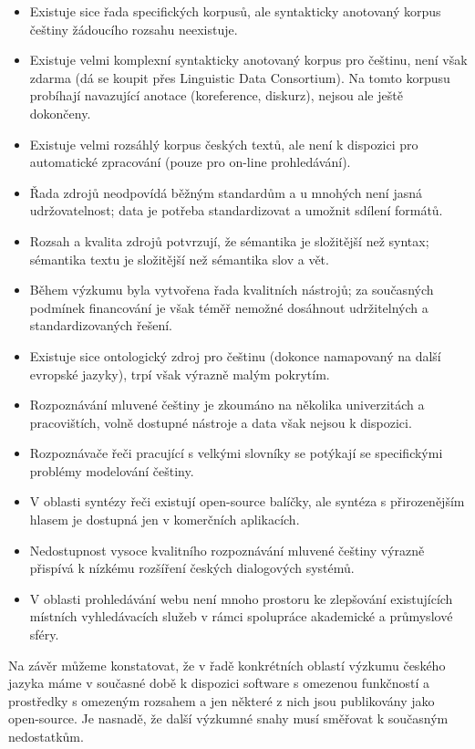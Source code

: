 \documentclass[]{../../metanetpaper}
\begin{document}
\begin{multicols}{2}
\begin{itemize}
\item Existuje sice řada specifických korpusů, ale syntakticky anotovaný korpus češtiny žádoucího rozsahu neexistuje.
\item Existuje velmi komplexní syntakticky anotovaný korpus pro češtinu, není však zdarma (dá se koupit přes Linguistic Data Consortium). Na tomto korpusu probíhají navazující anotace (koreference, diskurz), nejsou ale ještě dokončeny.
\item Existuje velmi rozsáhlý korpus českých textů, ale není k dispozici pro automatické zpracování (pouze pro on-line prohledávání).
\item Řada zdrojů neodpovídá běžným standardům a u mnohých není jasná udržovatelnost; data je potřeba standardizovat a umožnit sdílení formátů.
\item Rozsah a kvalita zdrojů potvrzují, že sémantika je složitější než syntax; sémantika textu je složitější než sémantika slov a vět.
\item Během výzkumu byla vytvořena řada kvalitních nástrojů; za současných podmínek financování je však téměř nemožné dosáhnout udržitelných a standardizovaných řešení.
\item Existuje sice ontologický zdroj pro češtinu (dokonce namapovaný na další evropské jazyky), trpí však výrazně malým pokrytím.
\item Rozpoznávání mluvené češtiny je zkoumáno na několika univerzitách a pracovištích, volně dostupné nástroje a data však nejsou k dispozici.
\item Rozpoznávače řeči pracující s velkými slovníky se potýkají se specifickými problémy modelování češtiny.
\item V oblasti syntézy řeči existují open-source balíčky, ale syntéza s přirozenějším hlasem je dostupná jen v komerčních aplikacích.
\item Nedostupnost vysoce kvalitního rozpoznávání mluvené češtiny výrazně přispívá k nízkému rozšíření českých dialogových systémů.
\item V oblasti prohledávání webu není mnoho prostoru ke zlepšování existujících místních vyhledávacích služeb v rámci spolupráce akademické a průmyslové sféry.
\end{itemize}

Na závěr můžeme konstatovat, že v řadě konkrétních oblastí výzkumu českého jazyka máme v současné době k dispozici software s omezenou funkčností a prostředky s omezeným rozsahem a jen některé z nich jsou publikovány jako open-source. Je nasnadě, že další výzkumné snahy musí směřovat k současným nedostatkům.


\end{multicols}
\end{document}

